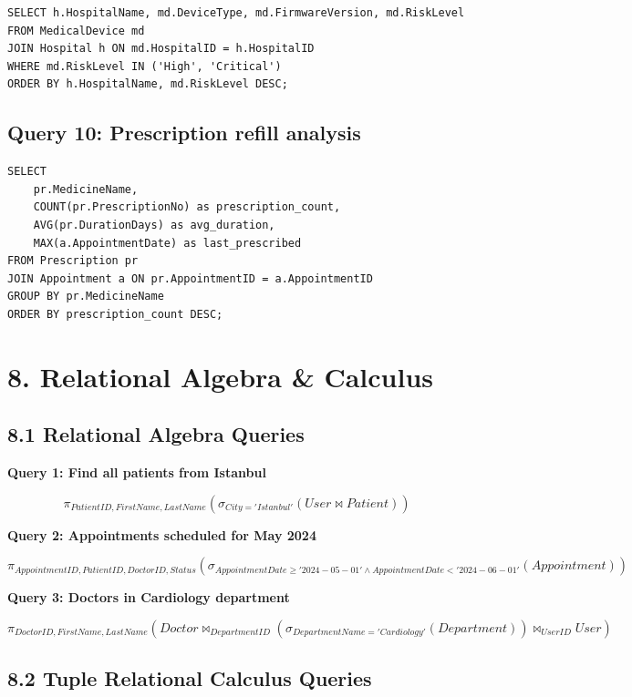 \begin{verbatim}
SELECT h.HospitalName, md.DeviceType, md.FirmwareVersion, md.RiskLevel
FROM MedicalDevice md
JOIN Hospital h ON md.HospitalID = h.HospitalID
WHERE md.RiskLevel IN ('High', 'Critical')
ORDER BY h.HospitalName, md.RiskLevel DESC;
\end{verbatim}

\subsection*{Query 10: Prescription refill analysis}

\begin{verbatim}
SELECT 
    pr.MedicineName, 
    COUNT(pr.PrescriptionNo) as prescription_count,
    AVG(pr.DurationDays) as avg_duration,
    MAX(a.AppointmentDate) as last_prescribed
FROM Prescription pr
JOIN Appointment a ON pr.AppointmentID = a.AppointmentID
GROUP BY pr.MedicineName
ORDER BY prescription_count DESC;
\end{verbatim}

\newpage
\section*{8. Relational Algebra \& Calculus}

\subsection*{8.1 Relational Algebra Queries}

\textbf{Query 1: Find all patients from Istanbul}

\[\pi_{PatientID, FirstName, LastName}(\sigma_{City='Istanbul'}(User \bowtie Patient))\]

\textbf{Query 2: Appointments scheduled for May 2024}

\[\pi_{AppointmentID, PatientID, DoctorID, Status}(\sigma_{AppointmentDate \geq '2024-05-01' \land AppointmentDate < '2024-06-01'}(Appointment))\]

\textbf{Query 3: Doctors in Cardiology department}

\[\pi_{DoctorID, FirstName, LastName}(Doctor \bowtie_{DepartmentID} (\sigma_{DepartmentName='Cardiology'}(Department)) \bowtie_{UserID} User)\]

\subsection*{8.2 Tuple Relational Calculus Queries}

